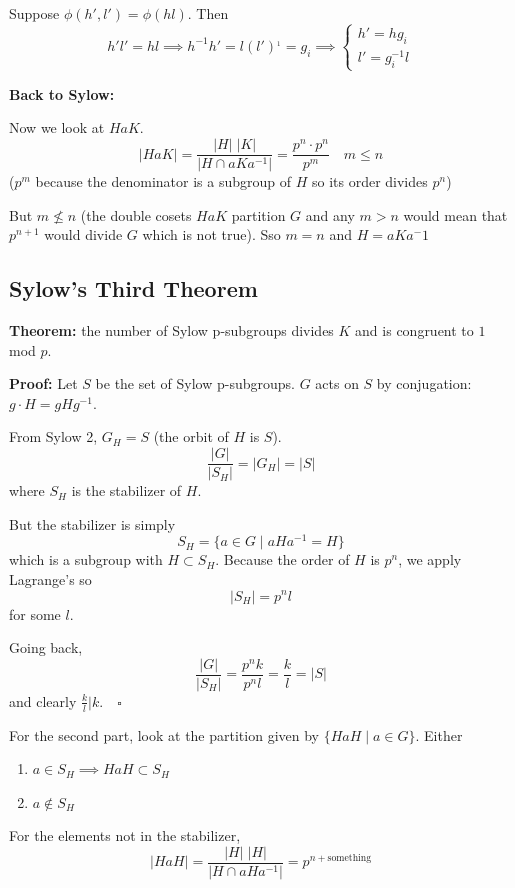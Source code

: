 \documentclass[12pt]{report}
\renewcommand{\v}{\big\vert}
\begin{document}
        Suppose $\phi(h', l') = \phi(hl)$. Then 
        \[h'l' = hl \implies h^{-1}h' = l(l')^{_1} = g_i \implies \begin{cases}
            h' = hg_i\\
            l' = g_i^{-1}l
        \end{cases}\]

        \textbf{Back to Sylow:}
        
        Now we look at $HaK$.
        \[\v HaK \v = \frac{\v H \v \;\v K\v}{\v H \cap aKa^{-1}\v} = \frac{p^n\cdot p^n}{p^m} \quad m\leq n\]
        ($p^m$ because the denominator is a subgroup of $H$ so its order divides $p^n$)

        But $m \not \leq n$ (the double cosets $HaK$ partition $G$ and any $m > n$ would mean that $p^{n+1}$ would divide $G$ which is not true). Sso  $m= n$ and $H = aKa^-1$

    \subsection*{Sylow's Third Theorem}
        \textbf{Theorem:} the number of Sylow p-subgroups divides $K$ and is congruent to $1$ mod $p$. 

        \textbf{Proof:} Let $S$ be the set of Sylow p-subgroups. $G$ acts on $S$ by conjugation: $g\cdot H = gHg^{-1}$. 

        From Sylow 2, $G_H = S$ (the orbit of $H$ is $S$). 
        \[\frac{\v G\v }{\v S_H\v} = \v G_H\v = \v S \v\]
        where $S_H$ is the stabilizer of $H$. 

        But the stabilizer is simply 
        \[S_H = \{a \in G \; | \; aHa^{-1} = H\}\]
        which is a subgroup with $H \subset S_H$. Because the order of $H$ is $p^n$, we apply Lagrange's so 
        \[\v S_H \v = p^n l\]
        for some $l$. 

        Going back, 
        \[\frac{\v G\v }{\v S_H\v} = \frac{p^n k}{p^n l} = \frac{k}{l} = \v S\v\]
        and clearly $\frac{k}{l} \bigg\vert k. \quad \square$

        For the second part, look at the partition given by $\{HaH \; | \; a \in G\}$. Either 
        \begin{enumerate}
            \item $a \in S_H \implies HaH \subset S_H$
            \item $a \not \in S_H$
        \end{enumerate}

        For the elements not in the stabilizer, 
        \[\v HaH\v = \frac{\v H \v \; \v H \v}{\v H \cap aHa^{-1}\v} = p^{n + \text{something}}\]
\end{document}

